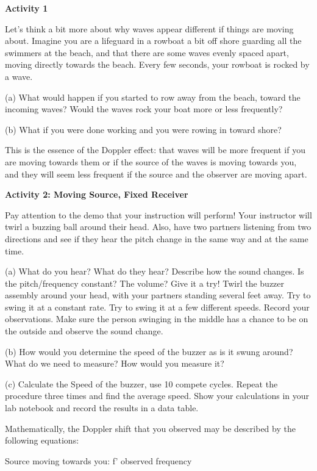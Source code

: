 \textbf{Activity 1}

Let’s think a bit more about why waves appear different if things are moving about. Imagine you are a lifeguard in a rowboat a bit off shore guarding all the swimmers at the beach, and that there are some waves evenly spaced apart, moving directly towards the beach. Every few seconds, your rowboat is rocked by a wave. 

(a) What would happen if you started to row away from the beach, toward the incoming waves? Would the waves rock your boat more or less frequently? 
\answerspace{32mm}


(b) What if you were done working and you were rowing in toward shore? 
\answerspace{32mm}

This is the essence of the Doppler effect: that waves will be more frequent if you are moving towards them or if the source of the waves is moving towards you, and they will seem less frequent if the source and the observer are moving apart.
\vspace{0.3cm}

\textbf{Activity 2: Moving Source, Fixed Receiver}

Pay attention to the demo that your instruction will perform! Your instructor will twirl a buzzing ball around their head. Also, have two partners listening from two directions and see if they hear the pitch change in the same way and at the same time.

(a) What do you hear? What do they hear? Describe how the sound changes. Is the pitch/frequency constant? The volume? Give it a try! Twirl the buzzer assembly around your head, with your partners standing several feet away. Try to swing it at a constant rate. Try to swing it at a few different speeds. Record your observations. Make sure the person swinging in the middle has a chance to be on the outside and observe the sound change.
\answerspace{30mm}

(b) How would you determine the speed of the buzzer as is it swung around? What do we need to measure? How would you measure it?
\answerspace{30mm}

(c) Calculate the Speed of the buzzer, use 10 compete cycles. Repeat the procedure three times and find the average speed. Show your calculations in your lab notebook and record the results in a data table.
\answerspace{30mm}

Mathematically, the Doppler shift that you observed may be described by the following equations:

Source moving towards you: f’ observed frequency

